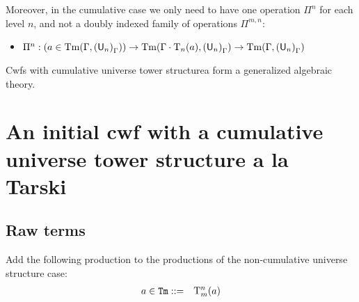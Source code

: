 \documentclass{lmcs}
\newcommand{\Ta}{\mathrm{T}}
\newcommand{\Tan}{\Ta_n}
\newcommand{\Un}{\U_n}
\newcommand{\Nhatn}{\N^n}
\newcommand{\Pihatn}{\Pi^n}
\newcommand{\Nn}{\Nhatn}
\newcommand{\Pin}{\Pihatn}
\begin{document}
Moreover, in the cumulative case we only need to have one operation $\Pi^n$ for each level $n$, and not a doubly indexed family of operations $\Pi^{m,n}$:
\newline
\begin{itemize}
\item 
$\Pi^n : (a \in \Tm(\Gamma,{(\U_n)}_\Gamma)) \to \Tm(\Gamma \cdot \Tan(a),{(\Un)}_\Gamma) \to \Tm(\Gamma,{(\U_{n})}_\Gamma)$
\end{itemize}

Cwfs with cumulative universe tower structurea form a generalized algebraic theory.

\section{An initial cwf with a cumulative universe tower structure a la Tarski}

\subsection{Raw terms}
Add the following production to the productions of the non-cumulative universe structure case:
\begin{eqnarray*}
a \in \RawTm &::=&  \Ta_m^n(a)
\end{eqnarray*}
\end{document}
